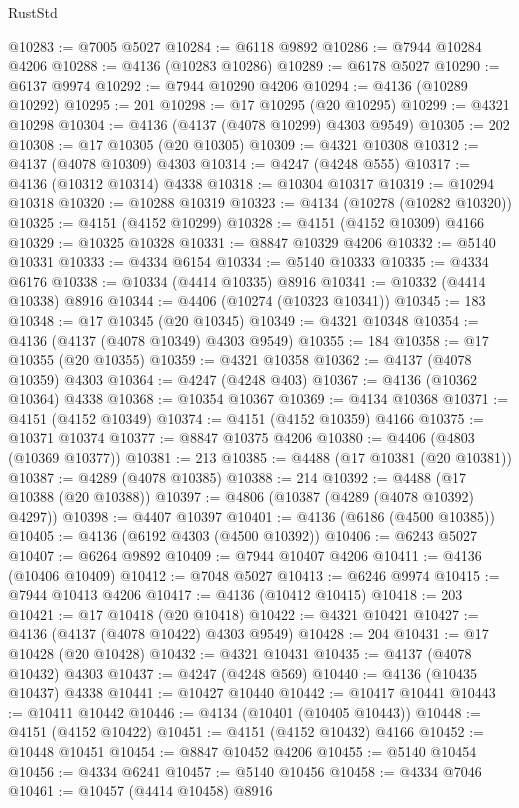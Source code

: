 \begin{lexlean}{RustStd}
\begin{coremodule}
{\begin{coremodule}
{{{{{{{{{{{{{{{{{{{{{{{{{{{{{{{{{{{{{{{{{{{{{{{{{{@10283 := @7005 @5027
@10284 := @6118 @9892
@10286 := @7944 @10284 @4206
@10288 := @4136 (@10283 @10286)
@10289 := @6178 @5027
@10290 := @6137 @9974
@10292 := @7944 @10290 @4206
@10294 := @4136 (@10289 @10292)
@10295 := 201
@10298 := @17 @10295 (@20 @10295)
@10299 := @4321 @10298
@10304 := @4136 (@4137 (@4078 @10299) @4303 @9549)
@10305 := 202
@10308 := @17 @10305 (@20 @10305)
@10309 := @4321 @10308
@10312 := @4137 (@4078 @10309) @4303
@10314 := @4247 (@4248 @555)
@10317 := @4136 (@10312 @10314) @4338
@10318 := @10304 @10317
@10319 := @10294 @10318
@10320 := @10288 @10319
@10323 := @4134 (@10278 (@10282 @10320))
@10325 := @4151 (@4152 @10299)
@10328 := @4151 (@4152 @10309) @4166
@10329 := @10325 @10328
@10331 := @8847 @10329 @4206
@10332 := @5140 @10331
@10333 := @4334 @6154
@10334 := @5140 @10333
@10335 := @4334 @6176
@10338 := @10334 (@4414 @10335) @8916
@10341 := @10332 (@4414 @10338) @8916
@10344 := @4406 (@10274 (@10323 @10341))
@10345 := 183
@10348 := @17 @10345 (@20 @10345)
@10349 := @4321 @10348
@10354 := @4136 (@4137 (@4078 @10349) @4303 @9549)
@10355 := 184
@10358 := @17 @10355 (@20 @10355)
@10359 := @4321 @10358
@10362 := @4137 (@4078 @10359) @4303
@10364 := @4247 (@4248 @403)
@10367 := @4136 (@10362 @10364) @4338
@10368 := @10354 @10367
@10369 := @4134 @10368
@10371 := @4151 (@4152 @10349)
@10374 := @4151 (@4152 @10359) @4166
@10375 := @10371 @10374
@10377 := @8847 @10375 @4206
@10380 := @4406 (@4803 (@10369 @10377))
@10381 := 213
@10385 := @4488 (@17 @10381 (@20 @10381))
@10387 := @4289 (@4078 @10385)
@10388 := 214
@10392 := @4488 (@17 @10388 (@20 @10388))
@10397 := @4806 (@10387 (@4289 (@4078 @10392) @4297))
@10398 := @4407 @10397
@10401 := @4136 (@6186 (@4500 @10385))
@10405 := @4136 (@6192 @4303 (@4500 @10392))
@10406 := @6243 @5027
@10407 := @6264 @9892
@10409 := @7944 @10407 @4206
@10411 := @4136 (@10406 @10409)
@10412 := @7048 @5027
@10413 := @6246 @9974
@10415 := @7944 @10413 @4206
@10417 := @4136 (@10412 @10415)
@10418 := 203
@10421 := @17 @10418 (@20 @10418)
@10422 := @4321 @10421
@10427 := @4136 (@4137 (@4078 @10422) @4303 @9549)
@10428 := 204
@10431 := @17 @10428 (@20 @10428)
@10432 := @4321 @10431
@10435 := @4137 (@4078 @10432) @4303
@10437 := @4247 (@4248 @569)
@10440 := @4136 (@10435 @10437) @4338
@10441 := @10427 @10440
@10442 := @10417 @10441
@10443 := @10411 @10442
@10446 := @4134 (@10401 (@10405 @10443))
@10448 := @4151 (@4152 @10422)
@10451 := @4151 (@4152 @10432) @4166
@10452 := @10448 @10451
@10454 := @8847 @10452 @4206
@10455 := @5140 @10454
@10456 := @4334 @6241
@10457 := @5140 @10456
@10458 := @4334 @7046
@10461 := @10457 (@4414 @10458) @8916
}}}}}}}}}}}}}}}}}}}}}}}}}}}}}}}}}}}}}}}}}}}}}}}}}}
\end{coremodule}}
\end{coremodule}
\end{lexlean}
